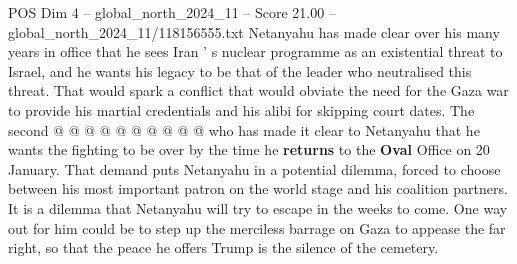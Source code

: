 \begin{textsample}{POS Dim 4 – global\_north\_2024\_11 – Score 21.00 – global\_north\_2024\_11/118156555.txt}
Netanyahu has made clear over his many years in office that he sees Iran ' s nuclear programme as an existential threat to Israel, and he wants his legacy to be that of the leader who neutralised this threat.
That would spark a conflict that would obviate the need for the Gaza war to provide his martial credentials and his alibi for skipping court dates.
The second @ @ @ @ @ @ @ @ @ @ who has made it clear to Netanyahu that he wants the fighting to be over by the time he \textbf{returns} to the \textbf{Oval} Office on 20 January.
That demand puts Netanyahu in a potential dilemma, forced to choose between his most important patron on the world stage and his coalition partners.
It is a dilemma that Netanyahu will try to escape in the weeks to come.
One way out for him could be to step up the merciless barrage on Gaza to appease the far right, so that the peace he offers Trump is the silence of the cemetery.

\end{textsample}
